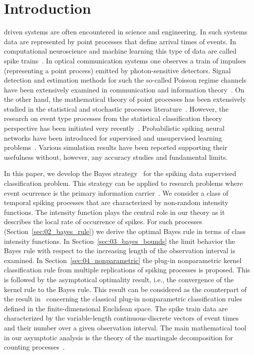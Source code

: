 \documentclass[lettersize,journal,onecolumn]{IEEEtran}
\theoremstyle{definition}
\begin{document}
\section{Introduction}
\label{sec:01_introduction}

 driven systems are often encountered in science and engineering. 
In such systems 
data are represented by point processes that define arrival times of events. In 
computational neuroscience and machine learning this type of data are called spike 
trains~\cite{gerstner2014neuronal, jang2019introduction, shchur2021neural}. 
In optical communication systems one observes a train of impulses (representing
a point process) emitted by photon-sensitive detectors. Signal detection and estimation
methods for such the so-called Poisson regime channels have been extensively examined
in communication and information theory~\cite{david69, guo08, merhav021}.
On the other hand, the mathematical theory of point processes has been extensively
studied in the statistical and stochastic processes
literature~\cite{daley2003introduction, andersen2012statistical}.
However, the research on event type processes from the statistical 
classification theory~\cite{devroye2013probabilistic} perspective has been initiated 
very recently~\cite{cholaquidis2017classification, rong2021error}. Probabilistic 
spiking neural networks have been introduced for supervised and unsupervised learning 
problems~\cite{jang2019introduction}. Various simulation results have been reported 
supporting their usefulness without, however, any accuracy studies and fundamental 
limits.

In this paper, we develop the Bayes strategy~\cite{devroye2013probabilistic} for the 
spiking data supervised classification problem. This strategy can be applied to 
research problems where event ocurrence is the primary information 
carrier~\cite{mazza2019rtbust, fanaee2014event}. We consider a class of 
temporal spiking processes that are characterized by non-random intensity functions. 
The intensity function plays the central role in our theory as it describes the
local rate of occurrence of spikes. For such processes 
(Section~\ref{sec:02_bayes_rule}) we derive the optimal Bayes rule in terms of class 
intensity functions. In Section~\ref{sec:03_bayes_bounds} the limit behavior the Bayes 
rule with respect to the increasing length of the observation interval is examined. In 
Section~\ref{sec:04_nonparametric} the plug-in nonparametric kernel classification rule 
from multiple replications of spiking processes is proposed. This is followed by the 
asymptotical optimality result, i.e., the convergence of the kernel rule to the Bayes 
rule. This result can be considered as the counterpart of the result 
in~\cite{greblicki1978asymptotically} concerning the classical plug-in nonparametric 
classification rules defined in the finite-dimensional Euclidean space. The spike train 
data are characterized by the variable-length continuous-discrete vectors of event times 
and their number over a given observation interval. The main mathematical tool in our
asymptotic analysis is the theory of the martingale decomposition for counting
processes~\cite{andersen2012statistical}.
\end{document}
